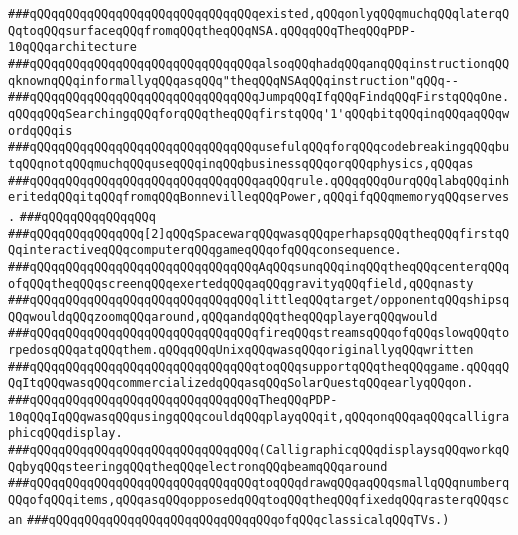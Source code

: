 \verb|###qQQqqQQqqQQqqQQqqQQqqQQqqQQqqQQqexisted,qQQqonlyqQQqmuchqQQqlaterqQQqtoqQQqsurfaceqQQqfromqQQqtheqQQqNSA.qQQqqQQqTheqQQqPDP-10qQQqarchitecture|\newline
\verb|###qQQqqQQqqQQqqQQqqQQqqQQqqQQqqQQqalsoqQQqhadqQQqanqQQqinstructionqQQqknownqQQqinformallyqQQqasqQQq"theqQQqNSAqQQqinstruction"qQQq--|\newline
\verb|###qQQqqQQqqQQqqQQqqQQqqQQqqQQqqQQqJumpqQQqIfqQQqFindqQQqFirstqQQqOne.qQQqqQQqSearchingqQQqforqQQqtheqQQqfirstqQQq'1'qQQqbitqQQqinqQQqaqQQqwordqQQqis|\newline
\verb|###qQQqqQQqqQQqqQQqqQQqqQQqqQQqqQQqusefulqQQqforqQQqcodebreakingqQQqbutqQQqnotqQQqmuchqQQquseqQQqinqQQqbusinessqQQqorqQQqphysics,qQQqas|\newline
\verb|###qQQqqQQqqQQqqQQqqQQqqQQqqQQqqQQqaqQQqrule.qQQqqQQqOurqQQqlabqQQqinheritedqQQqitqQQqfromqQQqBonnevilleqQQqPower,qQQqifqQQqmemoryqQQqserves.|\newline
\verb|###qQQqqQQqqQQqqQQq|\newline
\verb|###qQQqqQQqqQQqqQQq[2]qQQqSpacewarqQQqwasqQQqperhapsqQQqtheqQQqfirstqQQqinteractiveqQQqcomputerqQQqgameqQQqofqQQqconsequence.|\newline
\verb|###qQQqqQQqqQQqqQQqqQQqqQQqqQQqqQQqAqQQqsunqQQqinqQQqtheqQQqcenterqQQqofqQQqtheqQQqscreenqQQqexertedqQQqaqQQqgravityqQQqfield,qQQqnasty|\newline
\verb|###qQQqqQQqqQQqqQQqqQQqqQQqqQQqqQQqlittleqQQqtarget/opponentqQQqshipsqQQqwouldqQQqzoomqQQqaround,qQQqandqQQqtheqQQqplayerqQQqwould|\newline
\verb|###qQQqqQQqqQQqqQQqqQQqqQQqqQQqqQQqfireqQQqstreamsqQQqofqQQqslowqQQqtorpedosqQQqatqQQqthem.qQQqqQQqUnixqQQqwasqQQqoriginallyqQQqwritten|\newline
\verb|###qQQqqQQqqQQqqQQqqQQqqQQqqQQqqQQqtoqQQqsupportqQQqtheqQQqgame.qQQqqQQqItqQQqwasqQQqcommercializedqQQqasqQQqSolarQuestqQQqearlyqQQqon.|\newline
\verb|###qQQqqQQqqQQqqQQqqQQqqQQqqQQqqQQqTheqQQqPDP-10qQQqIqQQqwasqQQqusingqQQqcouldqQQqplayqQQqit,qQQqonqQQqaqQQqcalligraphicqQQqdisplay.|\newline
\verb|###qQQqqQQqqQQqqQQqqQQqqQQqqQQqqQQq(CalligraphicqQQqdisplaysqQQqworkqQQqbyqQQqsteeringqQQqtheqQQqelectronqQQqbeamqQQqaround|\newline
\verb|###qQQqqQQqqQQqqQQqqQQqqQQqqQQqqQQqtoqQQqdrawqQQqaqQQqsmallqQQqnumberqQQqofqQQqitems,qQQqasqQQqopposedqQQqtoqQQqtheqQQqfixedqQQqrasterqQQqscan|\newline
\verb|###qQQqqQQqqQQqqQQqqQQqqQQqqQQqqQQqofqQQqclassicalqQQqTVs.)|\newline
